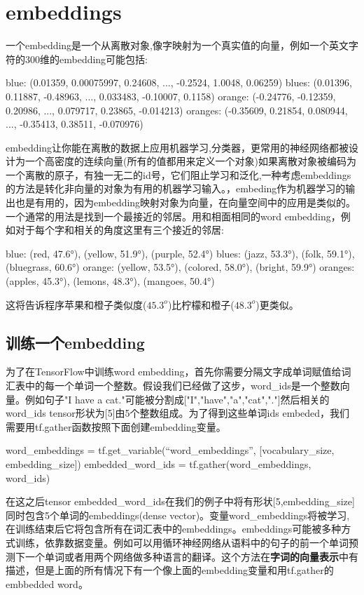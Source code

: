 \section{embeddings}
一个embedding是一个从离散对象,像字映射为一个真实值的向量，例如一个英文字符的300维的embedding可能包括:
\begin{python}
blue:  (0.01359, 0.00075997, 0.24608, ..., -0.2524, 1.0048, 0.06259)
blues:  (0.01396, 0.11887, -0.48963, ..., 0.033483, -0.10007, 0.1158)
orange:  (-0.24776, -0.12359, 0.20986, ..., 0.079717, 0.23865, -0.014213)
oranges:  (-0.35609, 0.21854, 0.080944, ..., -0.35413, 0.38511, -0.070976)
\end{python}
embedding让你能在离散的数据上应用机器学习,分类器，更常用的神经网络都被设计为一个高密度的连续向量(所有的值都用来定义一个对象)如果离散对象被编码为一个离散的原子，有独一无二的id号，它们阻止学习和泛化,一种考虑embeddings的方法是转化非向量的对象为有用的机器学习输入。，embeding作为机器学习的输出也是有用的，因为embedding映射对象为向量，在向量空间中的应用是类似的。一个通常的用法是找到一个最接近的邻居。用和相面相同的word embedding，例如对于每个字和相关的角度这里有三个接近的邻居:
\begin{python}
blue:  (red, 47.6°), (yellow, 51.9°), (purple, 52.4°)
blues:  (jazz, 53.3°), (folk, 59.1°), (bluegrass, 60.6°)
orange:  (yellow, 53.5°), (colored, 58.0°), (bright, 59.9°)
oranges:  (apples, 45.3°), (lemons, 48.3°), (mangoes, 50.4°)
\end{python}
这将告诉程序苹果和橙子类似度($45.3^o$)比柠檬和橙子($48.3^o$)更类似。
\subsection{训练一个embedding}
为了在TensorFlow中训练word embedding，首先你需要分隔文字成单词赋值给词汇表中的每一个单词一个整数。假设我们已经做了这步，word\_ids是一个整数向量。例如句子"I have a cat."可能被分割成["I","have","a","cat","."]然后相关的word\_ids tensor形状为[5]由5个整数组成。为了得到这些单词ids embeded，我们需要用tf.gather函数按照下面创建embedding变量。
\begin{python}
word_embeddings = tf.get_variable(“word_embeddings”,
    [vocabulary_size, embedding_size])
embedded_word_ids = tf.gather(word_embeddings, word_ids)
\end{python}
在这之后tensor embedded\_word\_ids在我们的例子中将有形状[5,embedding\_size]同时包含5个单词的embeddings(dense vector)。变量word\_embeddings将被学习,在训练结束后它将包含所有在词汇表中的embeddings。embeddings可能被多种方式训练，依靠数据变量。例如可以用循环神经网络从语料中的句子的前一个单词预测下一个单词或者用两个网络做多种语言的翻译。这个方法在\textbf{字词的向量表示}中有描述，但是上面的所有情况下有一个像上面的embedding变量和用tf.gather的embbedded word。
